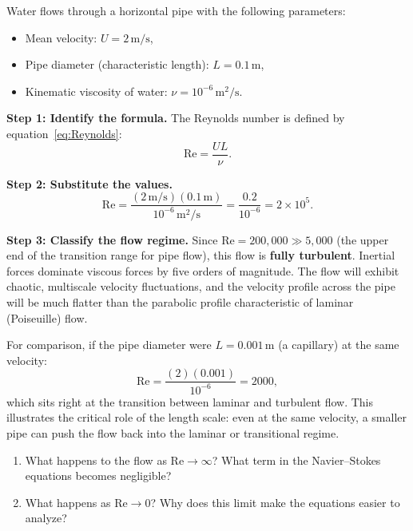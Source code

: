 \begin{example}
\label{ex:reynolds-pipe}
Water flows through a horizontal pipe with the following parameters:
\begin{itemize}
\item Mean velocity: $U = 2 \, \mathrm{m/s}$,
\item Pipe diameter (characteristic length): $L = 0.1 \, \mathrm{m}$,
\item Kinematic viscosity of water: $\nu = 10^{-6} \, \mathrm{m}^2/\mathrm{s}$.
\end{itemize}

\textbf{Step 1: Identify the formula.}
The Reynolds number is defined by equation~\eqref{eq:Reynolds}:
\[
\mathrm{Re} = \frac{UL}{\nu}.
\]

\textbf{Step 2: Substitute the values.}
\[
\mathrm{Re} = \frac{(2 \, \mathrm{m/s})(0.1 \, \mathrm{m})}{10^{-6} \, \mathrm{m}^2/\mathrm{s}} = \frac{0.2}{10^{-6}} = 2 \times 10^{5}.
\]

\textbf{Step 3: Classify the flow regime.}
Since $\mathrm{Re} = 200{,}000 \gg 5{,}000$ (the upper end of the transition range for pipe flow), this flow is \textbf{fully turbulent}. Inertial forces dominate viscous forces by five orders of magnitude. The flow will exhibit chaotic, multiscale velocity fluctuations, and the velocity profile across the pipe will be much flatter than the parabolic profile characteristic of laminar (Poiseuille) flow.

For comparison, if the pipe diameter were $L = 0.001 \, \mathrm{m}$ (a capillary) at the same velocity:
\[
\mathrm{Re} = \frac{(2)(0.001)}{10^{-6}} = 2000,
\]
which sits right at the transition between laminar and turbulent flow. This illustrates the critical role of the length scale: even at the same velocity, a smaller pipe can push the flow back into the laminar or transitional regime.
\end{example}

\begin{checkyou}
\begin{enumerate}
\item What happens to the flow as $\mathrm{Re} \to \infty$? What term in the Navier--Stokes equations becomes negligible?
\item What happens as $\mathrm{Re} \to 0$? Why does this limit make the equations easier to analyze?
\end{enumerate}
\end{checkyou}

